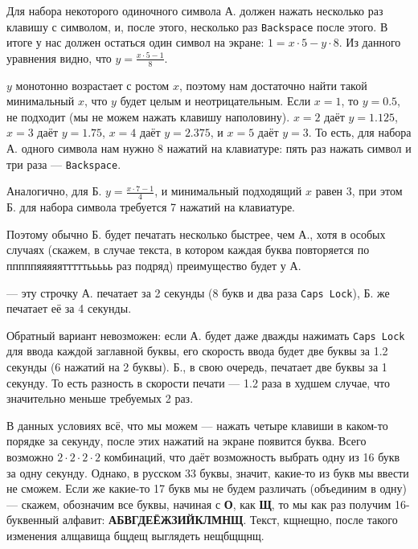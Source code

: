 \begin{itemize}
\itA Для набора некоторого одиночного символа А. должен нажать несколько раз клавишу с символом, 
и, после этого, несколько раз \verb!Backspace! после этого. В итоге у нас должен остаться один
символ на экране: $1 = x \cdot 5 - y \cdot 8$. Из данного уравнения видно, что
$y = \frac{x \cdot 5 - 1}{8}$.

$y$ монотонно возрастает с ростом $x$, поэтому нам достаточно найти такой минимальный $x$, что 
$y$ будет целым и неотрицательным. Если $x=1$, то $y = 0.5$, не подходит (мы не можем нажать
клавишу наполовину). $x=2$ даёт $y = 1.125$, $x=3$ даёт $y = 1.75$, $x=4$ даёт $y = 2.375$,
и $x=5$ даёт $y=3$. То есть, для набора А. одного символа нам нужно 8 нажатий на клавиатуре:
пять раз нажать символ и три раза --- \verb!Backspace!.

Аналогично, для Б. $y = \frac{x \cdot 7 - 1}{4}$, и минимальный подходящий $x$ равен 3, при этом
Б. для набора символа требуется 7 нажатий на клавиатуре.

Поэтому обычно Б. будет печатать несколько быстрее, чем А., хотя в особых случаях (скажем,
в случае текста, в котором каждая буква повторяется по пппппяяяяятттттььььь раз подряд)
преимущество будет у А.

 --- эту строчку А. печатает за 2 секунды (8 букв и два раза \verb!Caps Lock!), 
Б. же печатает её за 4 секунды.

Обратный вариант невозможен: если А. будет даже дважды нажимать \verb!Caps Lock! для ввода 
каждой заглавной буквы, его скорость ввода будет две буквы за 1.2 секунды (6 нажатий на 2 буквы). 
Б., в свою очередь, печатает две буквы за 1 секунду. То есть разность в скорости печати --- 1.2 раза
в худшем случае, что значительно меньше требуемых 2 раз.

\itC В данных условиях всё, что мы можем --- нажать четыре клавиши в каком-то порядке за секунду,
после этих нажатий на экране появится буква. 
Всего возможно $2\cdot 2 \cdot 2 \cdot 2$ комбинаций, что даёт 
возможность выбрать одну из 16 букв за одну секунду. 
Однако, в русском 33 буквы, значит, какие-то из букв мы ввести не сможем. Если же какие-то 17
букв мы не будем различать (объединим в одну) --- скажем, обозначим все буквы, начиная с {\bfseries О},
как {\bfseries Щ}, то мы как раз получим 16-буквенный алфавит: {\bfseries АБВГДЕЁЖЗИЙКЛМНЩ}. 
Текст, кщнещно, после такого изменения алщавища бщдещ выглядеть нещбщщнщ.
\end{itemize}
